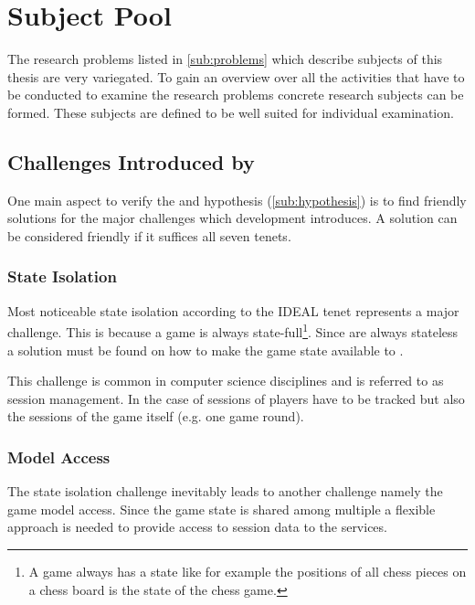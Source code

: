 \section{Subject Pool}
\label{sec:subject_pool}

The research problems listed in \autoref{sub:problems} which describe subjects
of this thesis are very variegated. To gain an overview over all the activities
that have to be conducted to examine the research problems concrete research
subjects can be formed. These subjects are defined to be well suited for
individual examination.

\subsection{Challenges Introduced by \mss{}}
\label{sub:ms_challenges}

One main aspect to verify the \ogs{} and \mss{} hypothesis
(\autoref{sub:hypothesis}) is to find \ms{} friendly solutions for the major
challenges which \og{} development introduces. A solution can be considered
\ms{} friendly if it suffices all seven \ms{}tenets.

\subsubsection{State Isolation}

Most noticeable \ms{} state isolation according to the IDEAL tenet represents a
major challenge. This is because a game is always state-full\footnote{A game
always has a state like for example the positions of all chess pieces on a chess
board is the state of the chess game.}. Since \mss{} are always stateless a
solution must be found on how to make the game state available to \mss{}.

This challenge is common in computer science disciplines and is referred to as
session management. In the case of \ogs{} sessions of players have to be
tracked but also the sessions of the game itself (e.g. one game round).

\subsubsection{Model Access}

The state isolation challenge inevitably leads to another challenge namely the
game model access. Since the game state is shared among multiple \mss{} a
flexible approach is needed to provide access to session data to the services.

